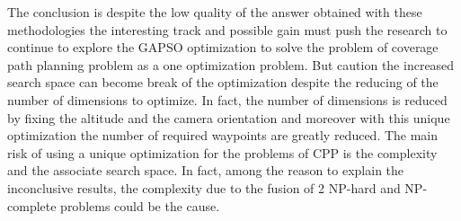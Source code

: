 The conclusion is despite the low quality of the answer obtained with these methodologies the interesting track and possible gain must push the research to continue to explore the GAPSO optimization to solve the problem of coverage path planning problem as a one optimization problem. But caution the increased search space can become break of the optimization despite the reducing of the number of dimensions to optimize. In fact, the number of dimensions is reduced by fixing the altitude and the camera orientation and moreover with this  unique optimization  the number of required waypoints are greatly reduced. 
The main risk of using  a unique optimization for the problems of CPP is the complexity and the associate search space. In fact, among the reason to explain the inconclusive results, the complexity due to the fusion of 2 NP-hard and NP-complete problems could be the cause. \\
		






